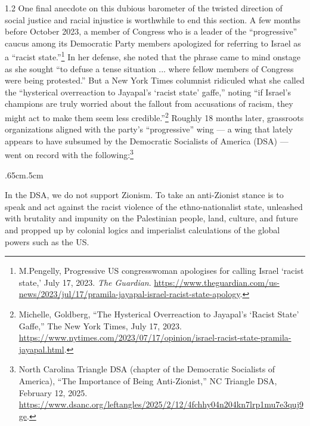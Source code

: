 \documentclass[../unravbook.tex]{subfiles}
\begin{document}
\begin{spacing}{1.2}
One final anecdote on this dubious barometer of the twisted direction of social justice and racial injustice is worthwhile to end this section. A few months before October 2023, a member of Congress who is a leader of the \enquote{progressive} caucus among its Democratic Party members apologized for referring to Israel as a ``racist state.''\footnote{M.Pengelly, Progressive US congresswoman apologises for calling Israel `racist state,' July 17, 2023. \textit{The Guardian}. \url{https://www.theguardian.com/us-news/2023/jul/17/pramila-jayapal-israel-racist-state-apology}.} In her defense, she noted that the phrase came to mind onstage as she sought ``to defuse a tense situation ... where fellow members of Congress were being protested.'' But a New York Times columnist ridiculed what she called the \enquote{hysterical overreaction to Jayapal's \enquote*{racist state} gaffe,} noting \enquote{if Israel's champions are truly worried about the fallout from accusations of racism, they might act to make them seem less credible.}\footnote{Michelle, Goldberg, \enquote{The Hysterical Overreaction to Jayapal's \enquote*{Racist State} Gaffe,} The New York Times, July 17, 2023. \url{https://www.nytimes.com/2023/07/17/opinion/israel-racist-state-pramila-jayapal.html}.} Roughly 18 months later, grassroots organizations aligned with the party's \enquote{progressive} wing  --- a wing that lately appears to have subsumed by the Democratic Socialists of America (DSA) --- went on record with the following:\footnote{ North Carolina Triangle DSA (chapter of the Democratic Socialists of America), \enquote{The Importance of Being Anti-Zionist,} NC Triangle DSA, February 12, 2025. \url{https://www.dsanc.org/leftangles/2025/2/12/4fchhy04n204kn7lrp1mu7e3quj9ge}.}

\begin{adjustwidth}{.65cm}{.5cm}
    \begin{singlespace}
    In the DSA, we do not support Zionism. To take an anti-Zionist stance is to speak and act against the racist violence of the ethno-nationalist state, unleashed with brutality and impunity on the Palestinian people, land, culture, and future and propped up by colonial logics and imperialist calculations of the global powers such as the US. 
   \end{singlespace}
\end{adjustwidth}


\end{spacing}
\end{document}
